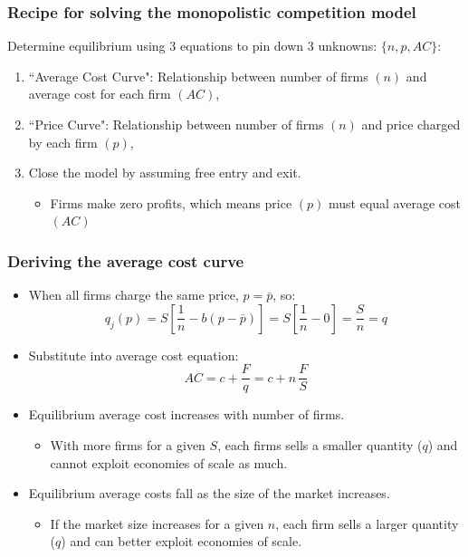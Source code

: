 \documentclass{beamer}
\begin{document}
\begin{frame}
	\frametitle{Recipe for solving the monopolistic competition model}
	
Determine equilibrium using 3 equations to pin down 3 unknowns: $\{n,p,AC\}$:
	\begin{enumerate}
		\item ``Average Cost Curve": Relationship between number of firms $(n)$ and average cost for each firm $(AC)$,
		\item ``Price Curve": Relationship between number of firms $(n)$ and price charged by each firm $(p)$,
		\item Close the model by assuming free entry and exit.
		\begin{itemize}
			\item Firms make zero profits, which means price $(p)$ must equal average cost $(AC)$
		\end{itemize}
	\end{enumerate}
\end{frame}

\begin{frame}
\frametitle{Deriving the average cost curve}
	\begin{itemize}
		\item When all firms charge the same price, $p = \bar{p} $, so:
		\begin{equation}
		q_j(p)=S \left[ \frac{1}{n} - b \left( p - \bar{p} \right) \right]=S \left[ \frac{1}{n} - 0 \right] = \frac{S}{n} = q \nonumber
		\end{equation}
		\item Substitute into average cost equation:
		\[ AC =   c + \frac{F}{q} = c + n \, \frac{F}{S} \]
		\item Equilibrium average cost increases with number of firms.
		\begin{itemize}
			\item With more firms for a given $S$, each firms sells a smaller quantity ($q$) and cannot exploit economies of scale as much.
		\end{itemize}
		\item Equilibrium average costs fall as the size of the market increases.
		\begin{itemize}
			\item If the market size increases for a given $n$, each firm sells a larger quantity ($q$) and can better exploit economies of scale.
		\end{itemize}
	\end{itemize}
\end{frame}
\end{document}
